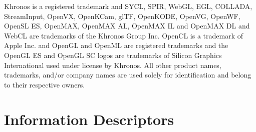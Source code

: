 \documentclass[10pt,twoside]{report}
\begin{document}
Khronos\textregistered{} is a registered trademark and
SYCL\texttrademark{}, SPIR\texttrademark{}, WebGL\texttrademark{},
EGL\texttrademark{}, COLLADA\texttrademark{},
StreamInput\texttrademark{}, OpenVX\texttrademark{},
OpenKCam\texttrademark{}, glTF\texttrademark{},
OpenKODE\texttrademark{}, OpenVG\texttrademark{},
OpenWF\texttrademark{}, OpenSL ES\texttrademark{},
OpenMAX\texttrademark{}, OpenMAX AL\texttrademark{}, OpenMAX
IL\texttrademark{} and OpenMAX DL\texttrademark{} and
WebCL\texttrademark{} are trademarks of the Khronos\textregistered{}
Group Inc.  OpenCL\texttrademark{} is a trademark of Apple Inc. and
OpenGL\textregistered{} and OpenML\textregistered{} are registered
trademarks and the OpenGL ES\texttrademark{} and OpenGL
SC\texttrademark{} logos are trademarks of Silicon Graphics
International used under license by Khronos\textregistered{}. All
other product names, trademarks, and/or company names are used solely
for identification and belong to their respective owners.


\tableofcontents
\listoftables
\listoffigures
\lstlistoflistings














\newpage
\appendix


\chapter{Information Descriptors}

\newpage
\renewcommand\bibname{References}



%
\clearpage
\printnoidxglossary[sort=word]
\end{document}
